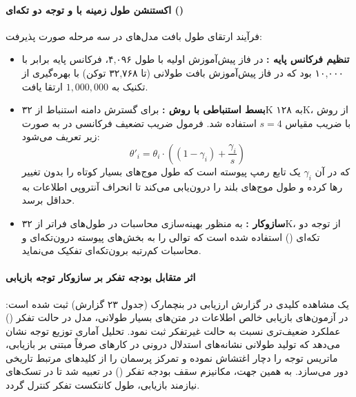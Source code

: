 \paragraph*{اکستنشن طول زمینه با  و توجه دو تکه‌ای ()}
فرآیند ارتقای طول بافت مدل‌های  در سه مرحله صورت پذیرفت:
\begin{itemize}
    \item \textbf{تنظیم فرکانس پایه :} در فاز پیش‌آموزش اولیه با طول ۴,۰۹۶، فرکانس پایه برابر با ۱۰,۰۰۰ بود که در فاز پیش‌آموزش بافت طولانی (تا ۳۲,۷۶۸ توکن) با بهره‌گیری از تکنیک  به $1{,}000{,}000$ ارتقا یافت.
    \item \textbf{بسط استنباطی با روش :} برای گسترش دامنه استنباط از ۳۲K به ۱۲۸K، از روش  \cite{peng2023yarn} با ضریب مقیاس $s=4$ استفاده شد. فرمول ضریب تضعیف فرکانسی در  به صورت زیر تعریف می‌شود:
    \begin{equation}
        \theta'_i = \theta_i \cdot \left( (1 - \gamma_i) + \frac{\gamma_i}{s} \right)
    \end{equation}
    که در آن $\gamma_i$ یک تابع رمپ پیوسته است که طول موج‌های بسیار کوتاه را بدون تغییر رها کرده و طول موج‌های بلند را درون‌یابی می‌کند تا انحراف آنتروپی اطلاعات به حداقل برسد.
    \item \textbf{سازوکار :} به منظور بهینه‌سازی محاسبات در طول‌های فراتر از ۳۲K، از توجه دو تکه‌ای () استفاده شده است که توالی را به بخش‌های پیوسته درون‌تکه‌ای و محاسبات کم‌رتبه برون‌تکه‌ای تفکیک می‌نماید.
\end{itemize}

\paragraph*{اثر متقابل بودجه تفکر بر سازوکار توجه بازیابی}
یک مشاهده کلیدی در گزارش ارزیابی  در بنچمارک  (جدول ۲۳ گزارش) ثبت شده است: در آزمون‌های بازیابی خالص اطلاعات در متن‌های بسیار طولانی، مدل در حالت تفکر () عملکرد ضعیف‌تری نسبت به حالت غیرتفکر ثبت نمود. تحلیل آماری توزیع توجه نشان می‌دهد که تولید طولانی نشانه‌های استدلال درونی در کارهای صرفاً مبتنی بر بازیابی، ماتریس توجه را دچار اغتشاش نموده و تمرکز پرسمان را از کلیدهای مرتبط تاریخی دور می‌سازد. به همین جهت، مکانیزم سقف بودجه تفکر () در  تعبیه شد تا در تسک‌های نیازمند بازیابی، طول کانتکست تفکر کنترل گردد.